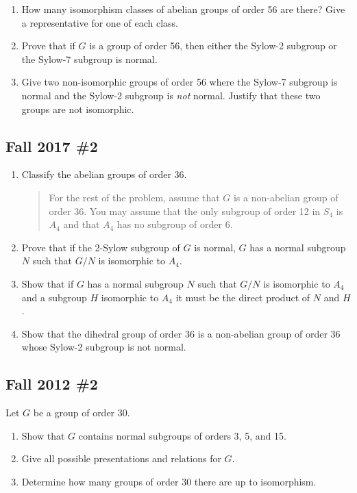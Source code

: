 \begin{enumerate}
\def\labelenumi{\alph{enumi}.}
\item
  How many isomorphism classes of abelian groups of order 56 are there?
  Give a representative for one of each class.
\item
  Prove that if \(G\) is a group of order 56, then either the Sylow-2
  subgroup or the Sylow-7 subgroup is normal.
\item
  Give two non-isomorphic groups of order 56 where the Sylow-7 subgroup
  is normal and the Sylow-2 subgroup is \emph{not} normal. Justify that
  these two groups are not isomorphic.
\end{enumerate}

\hypertarget{fall-2017-2}{%
\subsection{Fall 2017 \#2}\label{fall-2017-2}}

\begin{enumerate}
\def\labelenumi{\alph{enumi}.}
\item
  Classify the abelian groups of order 36.

  \begin{quote}
  For the rest of the problem, assume that \(G\) is a non-abelian group
  of order 36. You may assume that the only subgroup of order 12 in
  \(S_4\) is \(A_4\) and that \(A_4\) has no subgroup of order 6.
  \end{quote}
\item
  Prove that if the 2-Sylow subgroup of \(G\) is normal, \(G\) has a
  normal subgroup \(N\) such that \(G/N\) is isomorphic to \(A_4\).
\item
  Show that if \(G\) has a normal subgroup \(N\) such that \(G/N\) is
  isomorphic to \(A_4\) and a subgroup \(H\) isomorphic to \(A_4\) it
  must be the direct product of \(N\) and \(H\).
\item
  Show that the dihedral group of order 36 is a non-abelian group of
  order 36 whose Sylow-2 subgroup is not normal.
\end{enumerate}

\hypertarget{fall-2012-2}{%
\subsection{Fall 2012 \#2}\label{fall-2012-2}}

Let \(G\) be a group of order 30.

\begin{enumerate}
\def\labelenumi{\alph{enumi}.}
\item
  Show that \(G\) contains normal subgroups of orders 3, 5, and 15.
\item
  Give all possible presentations and relations for \(G\).
\item
  Determine how many groups of order 30 there are up to isomorphism.
\end{enumerate}

